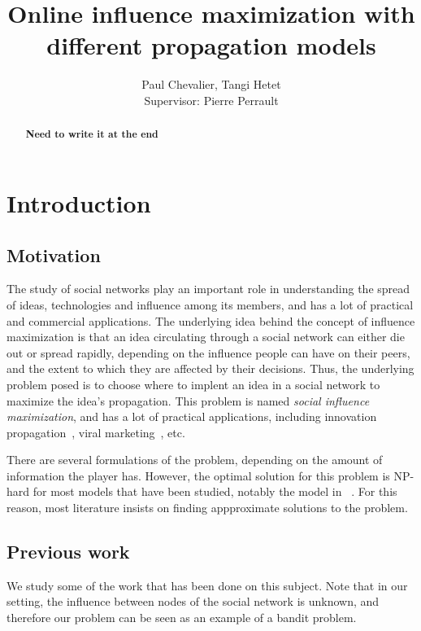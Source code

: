 \documentclass[a4paper,12pt]{article}
\title{Online influence maximization with different propagation models}
\author{Paul Chevalier, Tangi Hetet\\[0.5cm]{Supervisor: Pierre Perrault}}
\begin{document}
\maketitle

\begin{abstract}
\begin{center}
 \textbf{Need to write it at the end }
\end{center}
\end{abstract}

\section{Introduction}
\label{scn:intro}

\subsection{Motivation}

The study of social networks play an important role in understanding the spread of ideas, technologies and influence among its members, and has a lot of practical and commercial applications. The underlying idea behind the concept of influence maximization is that an idea circulating through a social network can either die out or spread rapidly, depending on the influence people can have on their peers, and the extent to which they are affected by their decisions. Thus, the underlying problem posed is to choose where to implent an idea in a social network to maximize the idea's propagation. This problem is named \emph{social influence maximization}, and has a lot of practical applications, including innovation propagation~\cite{coleman1966medical}, viral marketing~\cite{bass1976new}, etc.

There are several formulations of the problem, depending on the amount of information the player has. However, the optimal solution for this problem is NP-hard for most models that have been studied, notably the model in ~\cite{domingos2001mining}. For this reason, most literature insists on finding appproximate solutions to the problem.

\subsection{Previous work}

We study some of the work that has been done on this subject. Note that in our setting, the influence between nodes of the social network is unknown, and therefore our problem can be seen as an example of a bandit problem.
\end{document}
